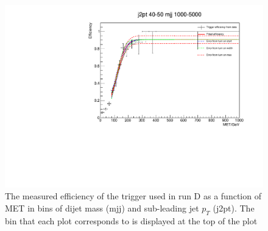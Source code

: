 \begin{figure}[h!]
\begin{center}
    \includegraphics[width=.6\largefigwidth]{plots/parked/trigfitplots/hData_MET_1D_25D.pdf}
    \caption{The measured efficiency of the trigger used in run D as a function of MET in bins of dijet mass (mjj) and sub-leading jet $p_{T}$ (j2pt). The bin that each plot corresponds to is displayed at the top of the plot}
    \label{fig:trigfitplotsD1}
  \end{center}
\end{figure}

